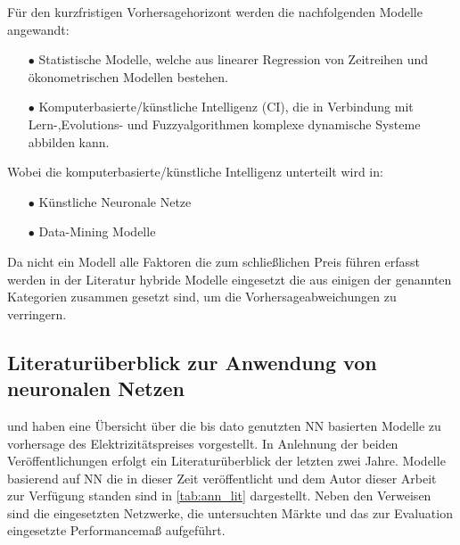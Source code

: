 Für den kurzfristigen Vorhersagehorizont werden die nachfolgenden Modelle angewandt:
\begin{itemize}
\item[\textbf{$\bullet$}]%
Statistische Modelle, welche aus linearer Regression von Zeitreihen und ökonometrischen Modellen bestehen.

\item[\textbf{$\bullet$}]%
Komputerbasierte/künstliche Intelligenz (CI), die in Verbindung mit Lern-,Evolutions- und Fuzzyalgorithmen komplexe dynamische Systeme abbilden kann.
\end{itemize}

Wobei die komputerbasierte/künstliche Intelligenz unterteilt wird in: 
\begin{itemize}
\item[\textbf{$\bullet$}]%
Künstliche Neuronale Netze

\item[\textbf{$\bullet$}]%
Data-Mining Modelle
\end{itemize}


Da nicht ein Modell alle Faktoren die zum schließlichen Preis führen erfasst werden in der Literatur hybride Modelle eingesetzt die aus einigen der genannten Kategorien zusammen gesetzt sind, um die Vorhersageabweichungen zu verringern.



\subsection{Literaturüberblick zur Anwendung von neuronalen Netzen}

\citet{Aggarwal2009} und \citet{Panapakidis2016} haben eine Übersicht über die bis dato genutzten NN basierten Modelle zu vorhersage des Elektrizitätspreises vorgestellt. In Anlehnung der beiden Veröffentlichungen erfolgt ein Literaturüberblick der letzten zwei Jahre. 
Modelle basierend auf NN die in dieser Zeit veröffentlicht und dem Autor dieser Arbeit zur Verfügung standen sind in \autoref{tab:ann_lit} dargestellt. Neben den Verweisen sind die eingesetzten Netzwerke, die untersuchten Märkte und das zur Evaluation eingesetzte Performancemaß aufgeführt.

